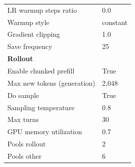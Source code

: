 \begin{table}[h!]
\begin{tabular}{ll}
LR warmup steps ratio & 0.0 \\
Warmup style & constant \\
Gradient clipping & 1.0 \\
Save frequency & 25 \\
\hline
\multicolumn{2}{l}{\textbf{Rollout}} \\
Enable chunked prefill & True \\
Max new tokens (generation) & 2,048 \\
Do sample & True \\
Sampling temperature & 0.8 \\
Max turns & 30 \\
GPU memory utilization & 0.7 \\
Pools rollout & 2 \\
Pools other & 6 \\
\hline
\end{tabular}
\end{table}